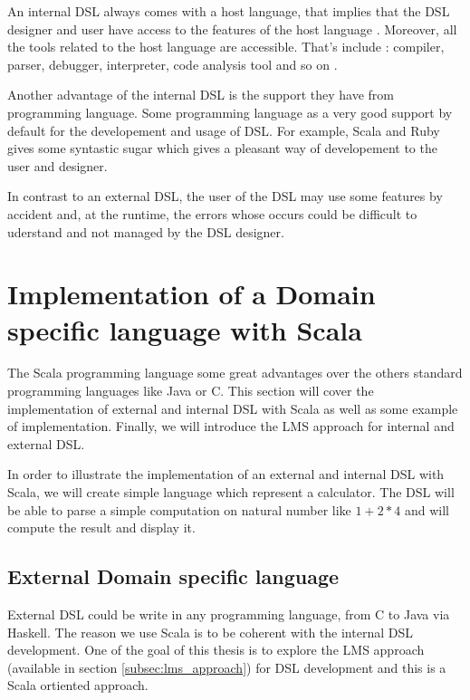 An internal \gls{DSL} always comes with a host language, that implies that the
\gls{DSL} designer and user have access to the features of the host language
\cite{strembeckmarkzdunuwe2009}. Moreover, all the tools related to the host
language are accessible. That's include : compiler, parser, debugger,
interpreter, code analysis tool and so on \cite{strembeckmarkzdunuwe2009}.

Another advantage of the internal \gls{DSL} is the support they have from
programming language. Some programming language as a very good support by
default for the developement and usage of \gls{DSL}. For example, Scala and Ruby
gives some syntastic sugar which gives a pleasant way of developement to the
user and designer.

In contrast to an external \gls{DSL}, the user of the \gls{DSL} may use some
features by accident and, at the runtime, the errors whose occurs could be
difficult to uderstand and not managed by the \gls{DSL} designer.

\section{Implementation of a Domain specific language with Scala}
\label{sec:implementation_of_a_dsl}

The Scala programming language some great advantages over the others standard
programming languages like Java or C. This section will cover the implementation
of external and internal \gls{DSL} with Scala as well as some example of
implementation. Finally, we will introduce the \gls{LMS} approach for internal
and external \gls{DSL}.

In order to illustrate the implementation of an external and internal \gls{DSL}
with Scala, we will create simple language which represent a calculator. The
\gls{DSL} will be able to parse a simple computation on natural number like $1 +
2 * 4$ and will compute the result and display it.

\subsection{External Domain specific language}
\label{subsec:scala_external_dsl}

External \gls{DSL} could be write in any programming language, from C to Java
via Haskell. The reason we use Scala is to be coherent with the internal
\gls{DSL} development. One of the goal of this thesis is to explore the
\gls{LMS} approach (available in section \ref{subsec:lms_approach}) for
\gls{DSL} development and this is a Scala ortiented approach.

